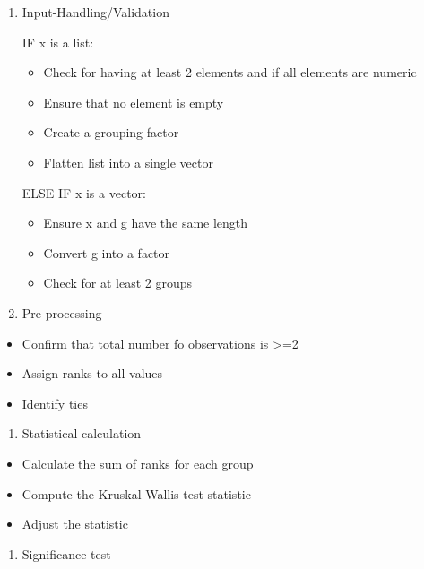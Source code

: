 \documentclass[
]{article}
\providecommand{\tightlist}{%
  \setlength{\itemsep}{0pt}\setlength{\parskip}{0pt}}
\begin{document}
\begin{enumerate}
\def\labelenumi{\arabic{enumi}.}
\item
  Input-Handling/Validation

  IF x is a list:

  \begin{itemize}
  \tightlist
  \item
    Check for having at least 2 elements and if all elements are numeric
  \item
    Ensure that no element is empty
  \item
    Create a grouping factor
  \item
    Flatten list into a single vector
  \end{itemize}

  ELSE IF x is a vector:

  \begin{itemize}
  \tightlist
  \item
    Ensure x and g have the same length
  \item
    Convert g into a factor
  \item
    Check for at least 2 groups
  \end{itemize}
\item
  Pre-processing
\end{enumerate}

\begin{itemize}
\tightlist
\item
  Confirm that total number fo observations is \textgreater=2
\item
  Assign ranks to all values
\item
  Identify ties
\end{itemize}

\begin{enumerate}
\def\labelenumi{\arabic{enumi}.}
\setcounter{enumi}{2}
\tightlist
\item
  Statistical calculation
\end{enumerate}

\begin{itemize}
\tightlist
\item
  Calculate the sum of ranks for each group
\item
  Compute the Kruskal-Wallis test statistic
\item
  Adjust the statistic
\end{itemize}

\begin{enumerate}
\def\labelenumi{\arabic{enumi}.}
\setcounter{enumi}{3}
\tightlist
\item
  Significance test
\end{enumerate}
\end{document}

